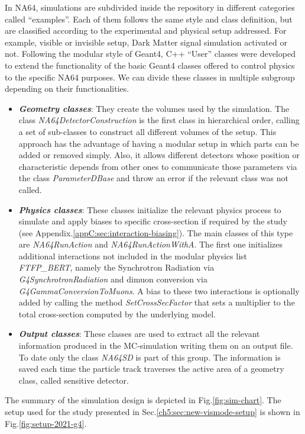 In NA64, simulations are subdivided inside the repository in different categories called ``examples''. Each of them follows the same style and class definition, but are classified according to the experimental and physical setup addressed. For example, visible or invisible setup, Dark Matter signal simulation activated or not.
Following the modular style of Geant4, C++ ``User'' classes were developed to extend the functionality of the basic Geant4 classes offered to control physics to the specific NA64 purposes. We can divide these classes in multiple subgroup depending on their functionalities.

\begin{itemize}
\item \textbf{\textit{Geometry classes}}: They create the volumes used by the simulation. The class \textit{NA64DetectorConstruction} is the first class in hierarchical order, calling a set of sub-classes to construct all different volumes of the setup. This approach has the advantage of having a modular setup in which parts can be added or removed simply. Also, it allows different detectors whose position or characteristic depends from other ones to communicate those parameters via the class \textit{ParameterDBase} and throw an error if the relevant class was not called.
\item \textbf{\textit{Physics classes}}: These classes initialize the relevant physics process to simulate and apply biases to specific cross-section if required by the study (see Appendix.\ref{appC:sec:interaction-biasing}). The main classes of this type are \textit{NA64RunAction} and \textit{NA64RunActionWithA}. The first one initializes additional interactions not included in the modular physics list \textit{FTFP\_BERT}, namely the Synchrotron Radiation via \textit{G4SynchrotronRadiation} and dimuon conversion via \textit{G4GammaConversionToMuons}. A bias to these two interactions is optionally added by calling the method \textit{SetCrossSecFactor} that sets a multiplier to the total cross-section computed by the underlying model.
\item \textbf{\textit{Output classes}}: These classes are used to extract all the relevant information produced in the MC-simulation writing them on an output file. To date only the class \textit{NA64SD} is part of this group. The information is saved each time the particle track traverses the active area of a geometry class, called sensitive detector. 
\end{itemize}


The summary of the simulation design is depicted in Fig.\ref{fig:sim-chart}. The setup used for the study presented in Sec.\ref{ch5:sec:new-vismode-setup} is shown in Fig.\ref{fig:setup-2021-g4}.

